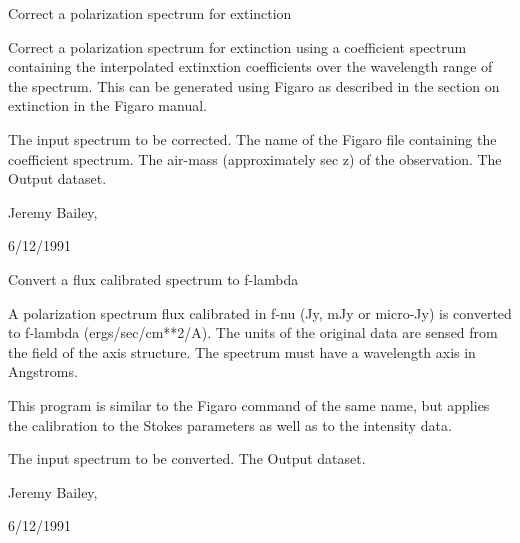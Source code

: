 \begin{manroutinedescription}
        Correct a polarization spectrum for extinction

        Correct a polarization spectrum for extinction using a coefficient
        spectrum containing the interpolated extinxtion coefficients over
        the wavelength range of the spectrum. This can be generated using
        Figaro as described in the section on extinction in the Figaro
        manual.

\begin{manparametertable}
  The input %
spectrum to be corrected.
     The name of the Figaro file %
containing
                                the coefficient spectrum.
     The air-mass (approximately %
sec z) of
                                the observation.
  The %
Output dataset.

\end{manparametertable}
           Jeremy Bailey, {}

           6/12/1991

\end{manroutinedescription}
\begin{manroutinedescription}
        Convert a flux calibrated spectrum to f-lambda

        A polarization spectrum flux calibrated in f-nu (Jy, mJy or
        micro-Jy) is converted to f-lambda (ergs/sec/cm**2/A). The
        units of the original data are sensed from the {} field
        of the axis structure. The spectrum must have a wavelength
        axis in Angstroms.

        This program is similar to the Figaro command of the same name,
        but applies the calibration to the Stokes parameters as well
        as to the intensity data.

\begin{manparametertable}
  The input %
spectrum to be converted.
  The %
Output dataset.

\end{manparametertable}
        Jeremy Bailey, {}

        6/12/1991

\end{manroutinedescription}
